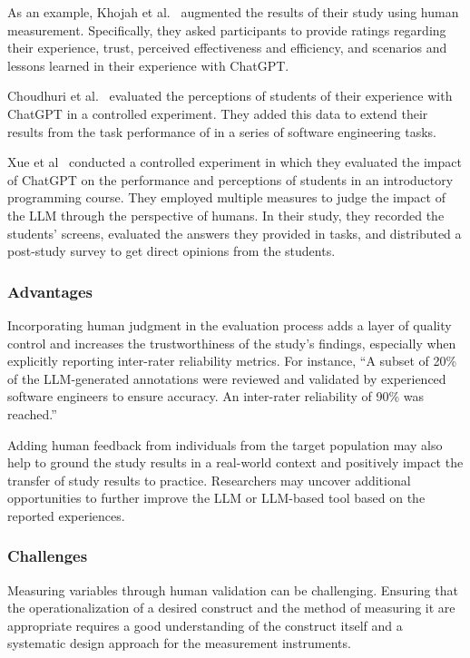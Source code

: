 \documentclass[11pt]{article}
\begin{document}
As an example, Khojah et al.~\cite{DBLP:journals/pacmse/KhojahM0N24} augmented the results of their study using human measurement.
Specifically, they asked participants to provide ratings regarding their experience, trust, perceived effectiveness and efficiency, and scenarios and lessons learned in their experience with ChatGPT.

Choudhuri et al.~\cite{DBLP:conf/icse/ChoudhuriLSGS24} evaluated the perceptions of students of their experience with ChatGPT in a controlled experiment.
They added this data to extend their results from the task performance of in a series of software engineering tasks.

Xue et al~\cite{DBLP:conf/icse/XueCBTH24} conducted a controlled experiment in which they evaluated the impact of ChatGPT on the performance and perceptions of students in an introductory programming course.
They employed multiple measures to judge the impact of the LLM through the perspective of humans.
In their study, they recorded the students' screens, evaluated the answers they provided in tasks, and distributed a post-study survey to get direct opinions from the students.


\subsubsection{Advantages}

Incorporating human judgment in the evaluation process adds a layer of quality control and increases the trustworthiness of the study’s findings, especially when explicitly reporting inter-rater reliability metrics. For instance, ``A subset of 20\% of the LLM-generated annotations were reviewed and validated by experienced software engineers to ensure accuracy. An inter-rater reliability of 90\% was reached.''

Adding human feedback from individuals from the target population may also help to ground the study results in a real-world context and positively impact the transfer of study results to practice.
Researchers may uncover additional opportunities to further improve the LLM or LLM-based tool based on the reported experiences.

\subsubsection{Challenges}

Measuring variables through human validation can be challenging.
Ensuring that the operationalization of a desired construct and the method of measuring it are appropriate requires a good understanding of the construct itself and a systematic design approach for the measurement instruments.
\end{document}
